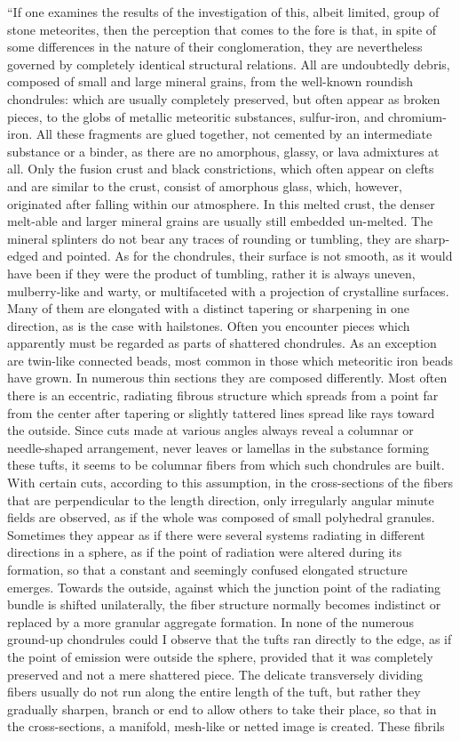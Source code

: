 \documentclass[a4paper, 11pt, oneside]{article}
\begin{document}
``If one examines the results of the investigation of this, albeit limited, group of stone meteorites, then the perception that comes to the fore is that, in spite of some differences in the nature of their conglomeration, they are nevertheless governed by completely identical structural relations. All are undoubtedly debris, composed of small and large mineral grains, from the well-known roundish chondrules: which are usually completely preserved, but often appear as broken pieces, to the globs of metallic meteoritic substances, sulfur-iron, and chromium-iron. All these fragments are glued together, not cemented by an intermediate substance or a binder, as there are no amorphous, glassy, or lava admixtures at all. Only the fusion crust and black constrictions, which often appear on clefts and are similar to the crust, consist of amorphous glass, which, however, originated after falling within our atmosphere. In this melted crust, the denser melt-able and larger mineral grains are usually still embedded un-melted. The mineral splinters do not bear any traces of rounding or tumbling, they are sharp-edged and pointed. As for the chondrules, their surface is not smooth, as it would have been if they were the product of tumbling, rather it is always uneven, mulberry-like and warty, or multifaceted with a projection of crystalline surfaces. Many of them are elongated with a distinct tapering or sharpening in one direction, as is the case with hailstones. Often you encounter pieces which apparently must be regarded as parts of shattered chondrules. As an exception are twin-like connected beads, most common in those which meteoritic iron beads have grown. In numerous thin sections they are composed differently. Most often there is an eccentric, radiating fibrous structure which spreads from a point far from the center after tapering or slightly tattered lines spread like rays toward the outside. Since cuts made at various angles always reveal a columnar or needle-shaped arrangement, never leaves or lamellas in the substance forming these tufts, it seems to be columnar fibers from which such chondrules are built. With certain cuts, according to this assumption, in the cross-sections of the fibers that are perpendicular to the length direction, only irregularly angular minute fields are observed, as if the whole was composed of small polyhedral granules. Sometimes they appear as if there were several systems radiating in different directions in a sphere, as if the point of radiation were altered during its formation, so that a constant and seemingly confused elongated structure emerges. Towards the outside, against which the junction point of the radiating bundle is shifted unilaterally, the fiber structure normally becomes indistinct or replaced by a more granular aggregate formation. In none of the numerous ground-up chondrules could I observe that the tufts ran directly to the edge, as if the point of emission were outside the sphere, provided that it was completely preserved and not a mere shattered piece. The delicate transversely dividing fibers usually do not run along the entire length of the tuft, but rather they gradually sharpen, branch or end to allow others to take their place, so that in the cross-sections, a manifold, mesh-like or netted image is created. These fibrils 
\end{document}
